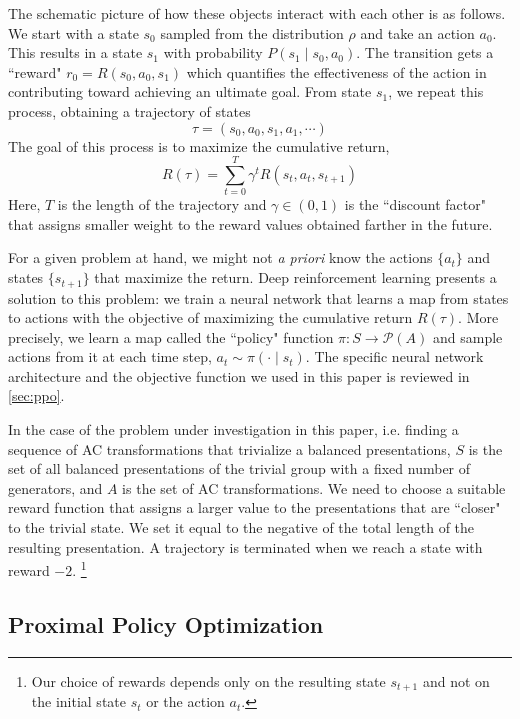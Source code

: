 The schematic picture of how these objects interact with each other is as follows. We start with a state $s_0$ sampled from the distribution $\rho$ and take an action $a_0$. This results in a state $s_1$ with probability $P(s_1 \mid s_0, a_0) $. The transition gets a ``reward" $r_0 = R(s_0, a_0, s_1)$ which quantifies the effectiveness of the action in contributing toward achieving an ultimate goal. From state $s_1$, we repeat this process, obtaining a trajectory of states
\[
\tau = \left( s_0, a_0, s_1, a_1, \cdots \right)
\]
The goal of this process is to maximize the cumulative return,
\[
R(\tau) = \sum\limits_{t=0}^{T} \gamma^t R(s_t, a_t, s_{t+1})
\]
Here, $T$ is the length of the trajectory and $\gamma \in \left(0, 1 \right)$ is the ``discount factor" that assigns smaller weight to the reward values obtained farther in the future. 
\newline

For a given problem at hand, we might not \textit{a priori} know the actions $\{a_t\}$ and states $\{s_{t+1}\}$ that maximize the return. Deep reinforcement learning presents a solution to this problem: we train a neural network that learns a map from states to actions with the objective of maximizing the cumulative return $R(\tau)$. More precisely, we learn a map called the ``policy" function $\pi : S \to \mathcal{P}(A)$ and sample actions from it at each time step, $a_t \sim \pi(\cdot \mid s_t)$. The specific neural network architecture and the objective function we used in this paper is reviewed in \autoref{sec:ppo}.
\newline 

In the case of the problem under investigation in this paper, i.e. finding a sequence of AC transformations that trivialize a balanced presentations, $S$ is the set of all balanced presentations of the trivial group with a fixed number of generators, and $A$ is the set of AC transformations. We need to choose a suitable reward function that assigns a larger value to the presentations that are ``closer" to the trivial state. We set it equal to the negative of the total length of the resulting presentation. A trajectory is terminated when we reach a state with reward $-2$.
\footnote{Our choice of rewards depends only on the resulting state $s_{t+1}$ and not on the initial state $s_t$ or the action $a_t$.}
\newline



\subsection{Proximal Policy Optimization} \label{sec:ppo}

